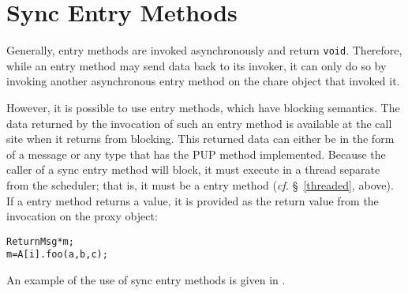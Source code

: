 
\section{Sync Entry Methods}
\label{sync}

Generally, entry methods are invoked asynchronously and return {\tt void}. Therefore,
while an entry method may send data back to its invoker, it can only do so by invoking
another asynchronous entry method on the chare object that invoked it.

However, it is possible to use  entry methods, which have blocking
semantics. The data returned by the invocation of such an entry method is
available at the call site when it returns from blocking. This returned data
can either be in the form of a \charmpp message or any type that has the PUP
method implemented. Because the caller of a sync entry
method will block, it must execute in a thread separate from the scheduler;
that is, it must be a  entry method ({\em cf.} \S~\ref{threaded},
above).  If a  entry method returns a value, it is provided as the
return value from the invocation on the proxy object:

\begin{alltt}
 ReturnMsg* m;
 m = A[i].foo(a, b, c);
\end{alltt}

An example of the use of sync entry methods is given in .
